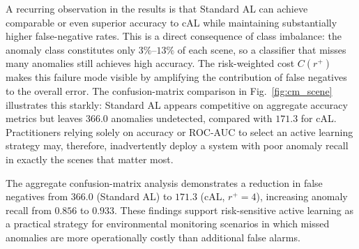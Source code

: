 A recurring observation in the results is that Standard AL can achieve
comparable or even superior accuracy to cAL while maintaining
substantially higher false-negative rates. This is a direct consequence
of class imbalance: the anomaly class constitutes only $3\%$--$13\%$
of each scene, so a classifier that misses many anomalies still achieves
high accuracy. The risk-weighted cost $C(r^{+})$ makes this failure
mode visible by amplifying the contribution of false negatives to the
overall error. The confusion-matrix comparison in
Fig.~\ref{fig:cm_scene} illustrates this starkly: Standard AL appears
competitive on aggregate accuracy metrics but leaves $366.0$ anomalies
undetected, compared with $171.3$ for cAL. Practitioners relying
solely on accuracy or ROC-AUC to select an active learning strategy
may, therefore, inadvertently deploy a system with poor anomaly recall
in exactly the scenes that matter most.


The aggregate confusion-matrix analysis demonstrates a reduction in false
negatives from $366.0$ (Standard AL) to $171.3$ (cAL, $r^{+}=4$),
increasing anomaly recall from $0.856$ to $0.933$. These findings
support risk-sensitive active learning as a practical strategy for
environmental monitoring scenarios in which missed anomalies are more
operationally costly than additional false alarms.


%


